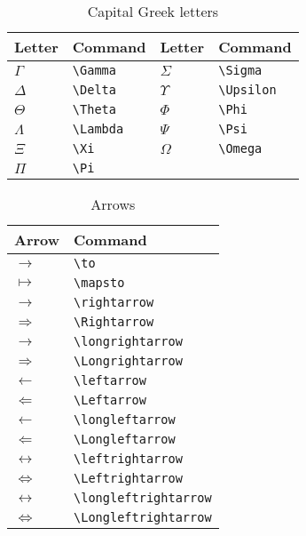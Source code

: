 \begin{table}
  \centering
  \caption{Capital Greek letters}
  \label{tab:capital-greek}
  \begin{tabular}{@{}llll@{}}
    \toprule
    Letter & Command & Letter & Command \\
    \midrule
    $\Gamma$ & \verb|\Gamma| & $\Sigma$ & \verb|\Sigma| \\
    $\Delta$ & \verb|\Delta| & $\Upsilon$ & \verb|\Upsilon|
    \\
    $\Theta$ & \verb|\Theta| & $\Phi$ & \verb|\Phi| \\
    $\Lambda$ & \verb|\Lambda| & $\Psi$ & \verb|\Psi| \\
    $\Xi$ & \verb|\Xi| & $\Omega$ & \verb|\Omega| \\
    $\Pi$ & \verb|\Pi| & & \\
    \bottomrule
  \end{tabular}  
\end{table}

\begin{table}
  \centering
  \caption{Arrows}
  \label{tab:arrows}
  \begin{tabular}{@{}ll@{}}
    \toprule
    Arrow & Command \\
    \midrule
    $\to$ & \verb|\to| \\
    $\mapsto$ & \verb|\mapsto| \\
    $\rightarrow$ & \verb|\rightarrow| \\
    $\Rightarrow$ & \verb|\Rightarrow| \\
    $\longrightarrow$ & \verb|\longrightarrow| \\
    $\Longrightarrow$ & \verb|\Longrightarrow| \\
    $\leftarrow$ & \verb|\leftarrow| \\
    $\Leftarrow$ & \verb|\Leftarrow| \\
    $\longleftarrow$ & \verb|\longleftarrow| \\
    $\Longleftarrow$ & \verb|\Longleftarrow| \\
    $\leftrightarrow$ & \verb|\leftrightarrow| \\
    $\Leftrightarrow$ & \verb|\Leftrightarrow| \\
    $\longleftrightarrow$ & \verb|\longleftrightarrow| \\
    $\Longleftrightarrow$ & \verb|\Longleftrightarrow| \\
    \bottomrule
  \end{tabular}  
\end{table}

